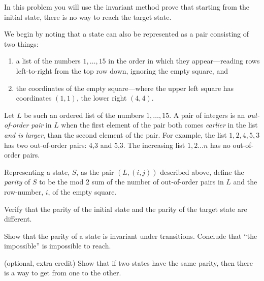 \documentclass[handout]{mcs}
\begin{document}
\begin{problem}
In this problem you will use the invariant method prove that starting
from the initial state, there is no way to reach the target state.

We begin by noting that a state can also be represented as a pair
consisting of two things:
\begin{enumerate}

\item a list of the numbers $1,\dots,15$ in the order in which they
appear---reading rows left-to-right from the top row down, ignoring the
empty square, and

\item the coordinates of the empty square---where the upper left
square has coordinates $(1,1)$, the lower right $(4,4)$.

\end{enumerate}

Let $L$ be such an ordered list of the numbers $1,\dots,15$.  A pair of
integers is an \emph{out-of-order pair} in $L$ when the first element of
the pair both comes \emph{earlier} in the list \emph{and is larger}, than
the second element of the pair.  For example, the list $1,2,4,5,3$ has two
out-of-order pairs: 4,3 and 5,3.  The increasing list $1,2\dots n$ has no
out-of-order pairs.

Representing a state, $S$, as the pair $(L, (i,j))$ described above,
define the \emph{parity} of $S$ to be the mod 2 sum of the number of
out-of-order pairs in $L$ and the row-number, $i$, of the empty
square.

\begin{problemparts}

\problempart Verify that the parity of the initial state and the parity of the
target state are different.


\problempart Show that the parity of a state is invariant under transitions.
Conclude that ``the impossible'' is impossible to reach.


\ppart (optional, extra credit) Show that if two states have the same
parity, then there is a way to get from one to the other.

\end{problemparts}
\end{problem}
\end{document}
